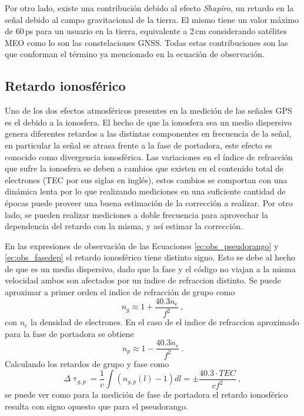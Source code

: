 \documentclass[a4paper,12pt,oneside,onecolumn,final,openright]{book}%
\begin{document}
	 Por otro lado, existe una contribución debido al efecto \textit{Shapiro}, un retardo en la señal debido al campo gravitacional de la tierra. El mismo tiene un valor máximo de 60\,ps para un usuario en la tierra, equivalente a 2\,cm considerando satélites MEO como lo son las constelaciones GNSS. Todas estas contribuciones son las que conforman el término ya mencionado en la ecuación de observación.
	 
	 
\subsection*{Retardo ionosférico}
	Uno de los dos efectos atmosféricos presentes en la medición de las señales GPS es el debido a la ionosfera. El hecho de que la ionosfera sea un medio dispersivo genera diferentes retardos a las distintas componentes en frecuencia de la señal, en particular la señal se atrasa frente a la fase de portadora, este efecto es conocido como divergencia ionosférica. Las variaciones en el índice de refracción que sufre la ionosfera se deben a cambios que existen en el contenido total de electrones (TEC por sus siglas en inglés), estos cambios se comportan con una dinámica lenta por lo que realizando mediciones en una suficiente cantidad de épocas puede proveer una buena estimación de la corrección a realizar. Por otro lado, se pueden realizar mediciones a doble frecuencia para aprovechar la dependencia del retardo con la misma, y así estimar la corrección. 
	
	En las expresiones de observación de las Ecuaciones \eqref{ec:obs_pseudorango} y \eqref{ec:obs_fasedep} el retardo ionosférico tiene distinto signo. Esto se debe al hecho de que es un medio dispersivo, dado que la fase y el código no viajan a la misma velocidad ambos son afectados por un indice de refraccion distinto. Se puede aproximar a primer orden el indice de refracción de grupo como 
\begin{equation}
	n_g \approx 1 + \dfrac{40.3n_e}{f^2} \ ,
\end{equation}
	con $n_e$ la densidad de electrones. En el caso de el indice de refraccion aproximado para la fase de portadora se obtiene
\begin{equation}
	n_p \approx 1 - \dfrac{40.3n_e}{f^2} \ .
\end{equation}
	Calculando los retardos de grupo y fase como 
\begin{equation}
	\Delta\uptau_{g,p} = \dfrac{1}{c}\int\left( n_{g,p}(l) - 1 \right)dl = \pm \dfrac{40.3\cdot TEC}{cf^2} \ ,
\end{equation}
	se puede ver como para la medición de fase de portadora el retardo ionosférico resulta con signo opuesto que para el pseudorango. 
	
\end{document}
